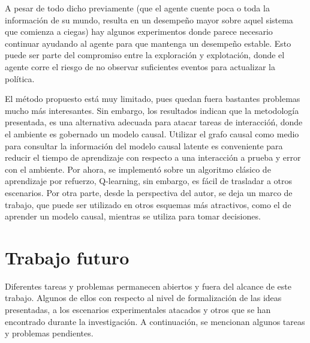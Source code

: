 
A pesar de todo dicho previamente (que el agente
cuente poca o toda la información de su mundo, resulta en un desempeño mayor sobre aquel
sistema que comienza a ciegas)
hay algunos experimentos donde parece necesario continuar ayudando al agente para que mantenga un desempeño estable. Esto puede ser parte del compromiso entre
la exploración y explotación, donde el agente corre el riesgo 
de no observar suficientes eventos para actualizar la política.


El método propuesto está muy limitado,
pues quedan fuera bastantes problemas mucho más interesantes.
Sin embargo, los resultados indican
que la metodología presentada, es una alternativa
adecuada para atacar tareas de interaccióń, donde el ambiente
es gobernado un modelo causal. Utilizar el grafo causal como
medio para consultar la información del modelo causal latente
es conveniente para reducir el tiempo de aprendizaje con 
respecto a una interacción a prueba y error con el ambiente.
Por ahora, se implementó sobre un algoritmo clásico de aprendizaje
por refuerzo, Q-learning, sin embargo, es fácil de
trasladar a otros escenarios. Por otra parte, 
desde la perspectiva del autor, se deja un marco de trabajo, 
que puede ser utilizado en otros esquemas más atractivos, 
como el de aprender un modelo causal, mientras se utiliza
para tomar decisiones.

\section{Trabajo futuro}

Diferentes tareas y problemas permanecen abiertos y fuera del alcance de este trabajo. Algunos de ellos con respecto al nivel de formalización de las ideas presentadas, a los escenarios experimentales atacados  y otros que se han encontrado durante la investigación. A continuación, se 
mencionan algunos tareas y problemas pendientes.

